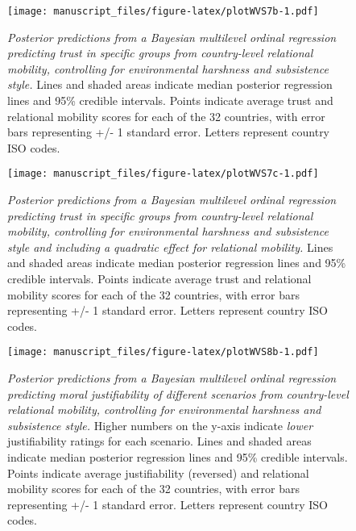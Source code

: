 \documentclass[
  man,floatsintext]{apa6}
\begin{document}
\newpage



\begin{figure}
\centering
\texttt{[image: manuscript\_files/figure-latex/plotWVS7b-1.pdf]}
\caption{\label{fig:plotWVS7b}\emph{Posterior predictions from a Bayesian multilevel ordinal regression predicting trust in specific groups from country-level relational mobility, controlling for environmental harshness and subsistence style.} Lines and shaded areas indicate median posterior regression lines and 95\% credible intervals. Points indicate average trust and relational mobility scores for each of the 32 countries, with error bars representing +/- 1 standard error. Letters represent country ISO codes.}
\end{figure}

\newpage



\begin{figure}
\centering
\texttt{[image: manuscript\_files/figure-latex/plotWVS7c-1.pdf]}
\caption{\label{fig:plotWVS7c}\emph{Posterior predictions from a Bayesian multilevel ordinal regression predicting trust in specific groups from country-level relational mobility, controlling for environmental harshness and subsistence style and including a quadratic effect for relational mobility.} Lines and shaded areas indicate median posterior regression lines and 95\% credible intervals. Points indicate average trust and relational mobility scores for each of the 32 countries, with error bars representing +/- 1 standard error. Letters represent country ISO codes.}
\end{figure}

\newpage



\begin{figure}
\centering
\texttt{[image: manuscript\_files/figure-latex/plotWVS8b-1.pdf]}
\caption{\label{fig:plotWVS8b}\emph{Posterior predictions from a Bayesian multilevel ordinal regression predicting moral justifiability of different scenarios from country-level relational mobility, controlling for environmental harshness and subsistence style.} Higher numbers on the y-axis indicate \emph{lower} justifiability ratings for each scenario. Lines and shaded areas indicate median posterior regression lines and 95\% credible intervals. Points indicate average justifiability (reversed) and relational mobility scores for each of the 32 countries, with error bars representing +/- 1 standard error. Letters represent country ISO codes.}
\end{figure}
\end{document}
